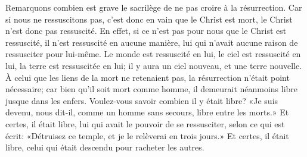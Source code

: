 Remarquons combien est grave le sacrilège de ne pas croire à la résurrection.
Car si nous ne ressuscitons pas,
	c’est donc en vain que le Christ est mort,
	le Christ n’est donc pas ressuscité.
En effet, si ce n’est pas pour nous que le Christ est ressuscité,
	il n’est ressuscité en aucune manière,
	lui qui n’avait aucune raison de ressusciter pour lui-même.
Le monde est ressuscité en lui, le ciel est ressuscité en lui,
	la terre est ressuscitée en lui;
	il y aura un ciel nouveau, et une terre nouvelle.
À celui que les liens de la mort ne retenaient pas,
	la résurrection n’était point nécessaire;
	car bien qu’il soit mort comme homme,
	il demeurait néanmoins libre jusque dans les enfers.
Voulez-vous savoir combien il y était libre?
	«Je suis devenu, nous dit-il,
	comme un homme sans secours, libre entre les morts.»
Et certes, il était libre, lui qui avait le pouvoir de se ressusciter,
	selon ce qui est écrit:
	«Détruisez ce temple, et je le relèverai en trois jours.»
Et certes, il était libre, celui qui était descendu pour racheter les autres.
